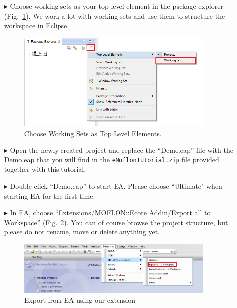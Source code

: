 \begin{enumerate}
\FloatBarrier
\item[$\blacktriangleright$] Choose working sets as your top level element in the package explorer (Fig.~\ref{fig_eclipseWorkingsets}).
We work a lot with working sets and use them to structure the workspace in Eclipse.

\begin{figure}[htbp]
	\centering
  \includegraphics[width=0.9\textwidth]{../installation_images/eclipse_workingsets.png}
	\caption{Choose Working Sets as Top Level Elements.}
	\label{fig_eclipseWorkingsets}
\end{figure} 


\item[$\blacktriangleright$] Open the newly created project and replace the ``Demo.eap'' file with the Demo.eap that you will find in the \texttt{eMoflonTutorial.zip} file provided together with this tutorial. 

\item[$\blacktriangleright$] Double click ``Demo.eap'' to start EA.
Please choose ``Ultimate" when starting EA for the first time.

\item[$\blacktriangleright$] In EA, choose ``Extensions/MOFLON::Ecore Addin/Export\- all\- to\- Workspace'' (Fig.~\ref{fig_ea}).
You can of course browse the project structure, but please do not rename, move or delete anything yet.
\begin{figure}[htbp]
	\centering
  \includegraphics[width=0.9\textwidth]{../installation_images/ea_firststart.png}
	\caption{Export from EA using our extension} 
	\label{fig_ea} 
\end{figure}


\end{enumerate}
